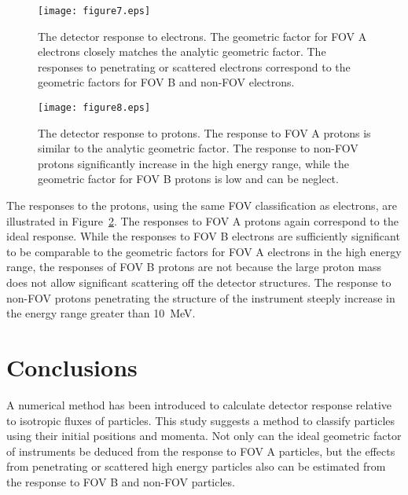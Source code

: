 \documentclass{jkas}
\begin{document}
\begin{figure}[t!]
\centering
\texttt{[image: figure7.eps]}
\caption{The detector response to electrons. The geometric factor for FOV A electrons closely matches the analytic geometric factor. The responses to penetrating or scattered electrons correspond to the geometric factors for FOV B and non-FOV electrons.\label{fig:fig7}}
\end{figure}

\begin{figure}[t!]
\centering
\texttt{[image: figure8.eps]}
\caption{The detector response to protons. The response to FOV A protons is similar to the analytic geometric factor. The response to non-FOV protons significantly increase in the high energy range, while the geometric factor for FOV B protons is low and can be neglect. \label{fig:fig8}}
\end{figure}


The responses to the protons, using the same FOV classification as electrons, are illustrated in Figure~\ref{fig:fig8}. The responses to FOV A protons again correspond to the ideal response. While the responses to FOV B electrons are sufficiently significant to be comparable to the geometric factors for FOV A electrons in the high energy range, the responses of FOV B protons are not because the large proton mass does not allow significant scattering off the detector structures. The response to non-FOV protons penetrating the structure of the instrument steeply increase in the energy range greater than 10~MeV.

\section{Conclusions\label{sec:conc}}

A numerical method has been introduced to calculate detector response relative to isotropic fluxes of particles. This study suggests a method to classify particles using their initial positions and momenta. Not only can the ideal geometric factor of instruments be deduced from the response to FOV A particles, but the effects from penetrating or scattered high energy particles also can be estimated from the response to FOV B and non-FOV particles.
\end{document}
